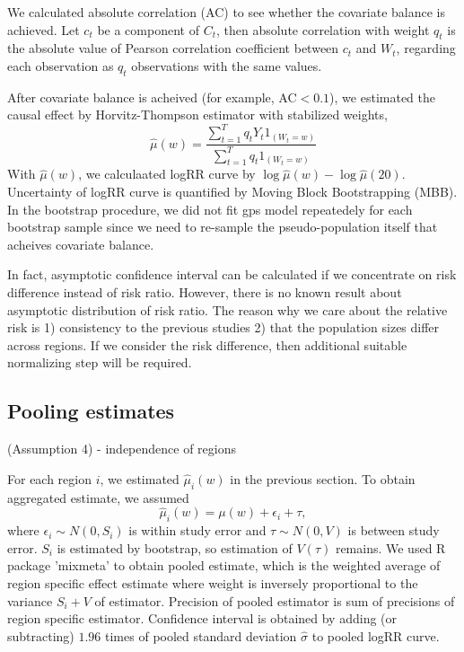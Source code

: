 \documentclass[12pt]{article}
\begin{document}
We calculated absolute correlation (AC)\cite{gpsboosting2015} 
to see whether the covariate balance is achieved.
Let $c_t$ be a component of $C_t$, then absolute correlation with weight $q_t$ is
the absolute value of Pearson correlation coefficient between $c_t$ and $W_t$,
regarding each observation as $q_t$ observations with the same values.

After covariate balance is acheived (for example, AC$<0.1$), 
we estimated the causal effect by Horvitz-Thompson estimator with stabilized weights,
\[
	\hat{\mu}(w) = \frac{\sum_{t = 1}^T q_t Y_t 1_{(W_t = w)}}{\sum_{t = 1}^T q_t 1_{(W_t = w)}}
\]
With $\hat{\mu}(w)$, we calculaated logRR curve by $\log\hat{\mu}(w) - \log \hat{\mu}(20)$.
Uncertainty of logRR curve is quantified by Moving Block Bootstrapping (MBB)\cite{mbb1989}.
In the bootstrap procedure, we did not fit gps model repeatedely for each bootstrap sample
since we need to re-sample the pseudo-population itself that acheives covariate balance.

In fact, asymptotic confidence interval can be calculated 
if we concentrate on risk difference instead of risk ratio.
However, there is no known result about asymptotic distribution of risk ratio.
The reason why we care about the relative risk is
1) consistency to the previous studies
2) that the population sizes differ across regions.
If we consider the risk difference, then additional suitable normalizing step will be required.

\subsection{Pooling estimates}

(Assumption 4) - independence of regions

For each region $i$, we estimated $\hat{\mu}_i(w)$ in the previous section.
To obtain aggregated estimate,
we assumed
\[
	\hat{\mu}_i(w) = \mu(w) + \epsilon_i + \tau,
\]
where $\epsilon_i \sim N(0, S_i)$ is within study error and $\tau \sim N(0, V)$ is between study error.
$S_i$ is estimated by bootstrap,
so estimation of $V(\tau)$ remains.
We used R package 'mixmeta' to obtain pooled estimate,
which is the weighted average of region specific effect estimate
where weight is inversely proportional to the variance $S_i + V$ of estimator.
Precision of pooled estimator is sum of precisions of region specific estimator.
Confidence interval is obtained by adding (or subtracting) 
$1.96$ times of pooled standard deviation $\hat{\sigma}$ to pooled logRR curve.
\end{document}
